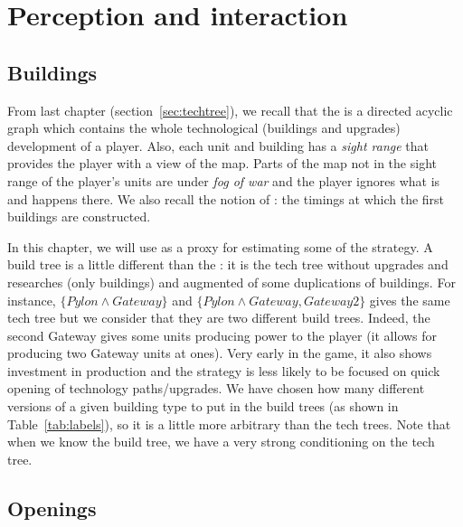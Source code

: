 \section{Perception and interaction}

\subsection{Buildings}
\label{sec:buildings}

From last chapter (section~\ref{sec:techtree}), we recall that the \textit{} is a directed acyclic graph which contains the whole technological (buildings and upgrades) development of a player. Also, each unit and building has a \textit{sight range} that provides the player with a view of the map. Parts of the map not in the sight range of the player's units are under \textit{fog of war} and the player ignores what is and happens there. We also recall the notion of : the timings at which the first buildings are constructed. 

In this chapter, we will use \textit{} as a proxy for estimating some of the strategy. A build tree is a little different than the : it is the tech tree without upgrades and researches (only buildings) and augmented of some duplications of buildings. For instance, $\{Pylon\wedge Gateway\}$ and $\{Pylon\wedge Gateway, Gateway2\}$ gives the same tech tree but we consider that they are two different build trees. Indeed, the second Gateway gives some units producing power to the player (it allows for producing two Gateway units at ones). Very early in the game, it also shows investment in production and the strategy is less likely to be focused on quick opening of technology paths/upgrades. 
We have chosen how many different versions of a given building type to put in the build trees (as shown in Table~\ref{tab:labels}), so it is a little more arbitrary than the tech trees. Note that when we know the build tree, we have a very strong conditioning on the tech tree.



\subsection{Openings}
\label{sec:openings}


